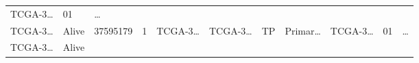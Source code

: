 \documentclass[
]{article}
\begin{document}
\begin{longtable}[]{@{}lllllllllll@{}}
\begin{minipage}[t]{0.09\columnwidth}
TCGA-3\ldots{}\strut
\end{minipage} & \begin{minipage}[t]{0.10\columnwidth}\raggedright
01\strut
\end{minipage} & \begin{minipage}[t]{0.03\columnwidth}\raggedright
\ldots{}\strut
\end{minipage}\tabularnewline
\begin{minipage}[t]{0.07\columnwidth}\raggedright
TCGA-3\ldots{}\strut
\end{minipage} & \begin{minipage}[t]{0.04\columnwidth}\raggedright
Alive\strut
\end{minipage} & \begin{minipage}[t]{0.06\columnwidth}\raggedright
37595179\strut
\end{minipage} & \begin{minipage}[t]{0.07\columnwidth}\raggedright
1\strut
\end{minipage} & \begin{minipage}[t]{0.07\columnwidth}\raggedright
TCGA-3\ldots{}\strut
\end{minipage} & \begin{minipage}[t]{0.07\columnwidth}\raggedright
TCGA-3\ldots{}\strut
\end{minipage} & \begin{minipage}[t]{0.07\columnwidth}\raggedright
TP\strut
\end{minipage} & \begin{minipage}[t]{0.07\columnwidth}\raggedright
Primar\ldots{}\strut
\end{minipage} & \begin{minipage}[t]{0.09\columnwidth}\raggedright
TCGA-3\ldots{}\strut
\end{minipage} & \begin{minipage}[t]{0.10\columnwidth}\raggedright
01\strut
\end{minipage} & \begin{minipage}[t]{0.03\columnwidth}\raggedright
\ldots{}\strut
\end{minipage}\tabularnewline
\begin{minipage}[t]{0.07\columnwidth}\raggedright
TCGA-3\ldots{}\strut
\end{minipage} & \begin{minipage}[t]{0.04\columnwidth}\raggedright
Alive\strut
\end{minipage} & \begin{minipage}[t]{0.06\columnwidth}\raggedright

\end{minipage}
\end{longtable}
\end{document}

